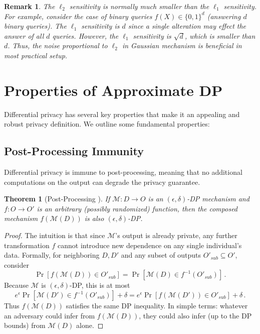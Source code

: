 \documentclass[11pt, a4paper]{article}
\newtheorem{theorem}{Theorem}
\newtheorem{remark}{Remark}
\begin{document}
\begin{remark}
    The $\ell_2$ sensitivity is normally much smaller than the $\ell_1$ sensitivity.
    For example, consider the case of binary queries $f(X) \in \{0, 1\}^d$ (answering $d$ binary queries).
    The $\ell_1$ sensitivity is $d$ since a single alteration may effect the answer of all $d$ queries.
    However, the $\ell_1$ sensitivity is $\sqrt{d}$, which is smaller than $d$.
    Thus, the noise proportional to $\ell_2$ in Gaussian mechanism is beneficial in most practical setup.
\end{remark}

\section{Properties of Approximate DP}

Differential privacy has several key properties that make it an appealing and robust privacy definition. We outline some fundamental properties:

\subsection{Post-Processing Immunity}

Differential privacy is immune to post-processing, meaning that no additional computations on the output can degrade the privacy guarantee.

\begin{theorem}[Post-Processing \cite{DworkRoth2014}]
If $\mathcal{M}: D \to O$ is an $(\epsilon,\delta)$-DP mechanism and $f: O \to O'$ is an arbitrary (possibly randomized) function, then the composed mechanism $f(\mathcal{M}(D))$ is also $(\epsilon,\delta)$-DP.
\end{theorem}

\begin{proof}
The intuition is that since $\mathcal{M}$'s output is already private, any further transformation $f$ cannot introduce new dependence on any single individual's data. Formally, for neighboring $D, D'$ and any subset of outputs $O'_{sub} \subseteq O'$, consider 
\[ \Pr[f(\mathcal{M}(D)) \in O'_{sub}] = \Pr[\mathcal{M}(D) \in f^{-1}(O'_{sub})] \,. \] 
Because $\mathcal{M}$ is $(\epsilon,\delta)$-DP, this is at most 
\[ e^{\epsilon} \Pr[\mathcal{M}(D') \in f^{-1}(O'_{sub})] + \delta = e^{\epsilon} \Pr[f(\mathcal{M}(D')) \in O'_{sub}] + \delta\,.\] 
Thus $f(\mathcal{M}(D))$ satisfies the same DP inequality. In simple terms: whatever an adversary could infer from $f(\mathcal{M}(D))$, they could also infer (up to the DP bounds) from $\mathcal{M}(D)$ alone.
\end{proof}
\end{document}
